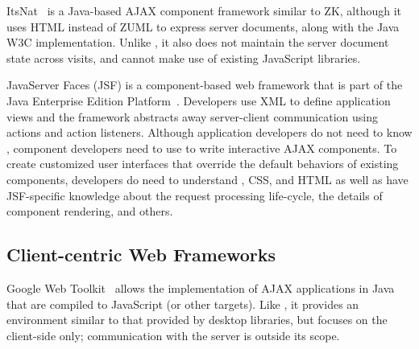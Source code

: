ItsNat~\cite{JoseMariaArranzSantamariaItsNat} is a Java-based AJAX
component framework similar to ZK, although it uses HTML instead of
ZUML to express server documents, along with the Java W3C implementation.  
Unlike \projectname, it also does not maintain the server document 
state across visits, and cannot make use of existing JavaScript libraries.

JavaServer Faces (JSF) is a component-based web framework that is part of
the Java Enterprise Edition Platform~\cite{j2eedoc}.
Developers use XML to define application views and the framework abstracts
away server-client communication using actions and action listeners.
Although application developers do not need to know \js, component
developers need to use \js to write interactive AJAX components.
To create customized user interfaces that override the
default behaviors of existing components,
developers do need to understand \js, CSS, and HTML as well as have
JSF-specific knowledge about the request processing life-cycle, 
the details of component rendering, and others.





\subsection{Client-centric Web Frameworks}

Google Web Toolkit~\cite{GWT} allows the implementation of
AJAX applications in Java that are compiled to JavaScript (or other
targets).  Like \projectname, it provides an environment similar to 
that provided by desktop libraries, but focuses on the client-side only; 
communication with the server is outside its scope.



